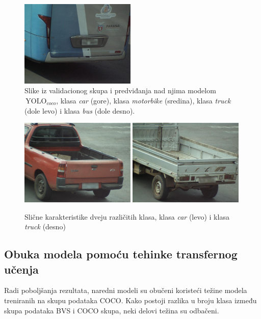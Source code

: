 \documentclass[12pt,oneside]{memoir}
\newcommand{\yolo}{\ensuremath{\,\textrm{YOLO}}}
\begin{document}
\begin{figure}[htbp]
      \includegraphics[width=0.49\textwidth]{matfmaster/yolo/v4/base/bus_0.jpg}
    \caption{Slike iz validacionog skupa i predviđanja nad njima modelom $\yolo_{coco}$, klasa \textit{car} (gore), klasa \textit{motorbike} (sredina),  klasa \textit{truck} (dole levo) i  klasa \textit{bus} (dole desno).} \label{fig:section4_yolo4base_images}
\end{figure}

\begin{figure}[htbp]
    \centering
      \includegraphics[width=0.49\textwidth]{matfmaster/glava4/carproblem.jpg}
      \includegraphics[width=0.49\textwidth]{matfmaster/glava4/truckproblem.jpg}
    \caption{Slične karakteristike dveju različitih klasa, klasa \textit{car} (levo) i klasa \textit{truck} (desno) } \label{fig:section4_yolo4base_problemimages}
\end{figure}


\subsection{Obuka modela pomoću tehinke transfernog učenja}
Radi poboljšanja rezultata, naredni modeli su obučeni koristeći težine modela treniranih na skupu podataka COCO. Kako postoji razlika u broju klasa između skupa podataka BVS i COCO skupa, neki delovi težina su odbačeni.
\end{document}
